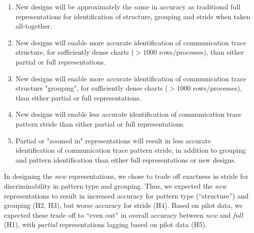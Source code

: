     \vspace{-.5em}
    \begin{enumerate}[start=1, label={\bfseries H\arabic*}]
        \itemsep-.3em
        \item New designs will be approximately the same in accuracy as traditional full representations for identification of structure, grouping and stride when taken all-together.
        \item New designs will enable more accurate identification of communication trace structure, for sufficiently dense charts ($>1000$ rows/processes), than either partial or full representations.
        \item New designs will enable more accurate identification of communication trace structure "grouping", for sufficiently dense charts ($>1000$ rows/processes), than either partial or full representations.
        \item New designs will enable less accurate identification of communication trace pattern stride than either partial or full representations.
        \item Partial or "zoomed in" representations will result in less accurate identification of communication trace pattern stride, in addition to grouping and pattern identification than either full representations or new designs.
    \end{enumerate}

In designing the {\em new} representations, we chose to trade off exactness in stride for discriminability in pattern type and grouping. Thus, we expected the {\em new} representations to result in increased accuracy for pattern type (``structure'') and grouping (H2, H3), but worse accuracy for stride (H4). Based on pilot data, we expected these trade off to ``even out'' in overall accuracy between {\em new} and {\em full} (H1), with {\em partial} representations lagging based on pilot data (H5).